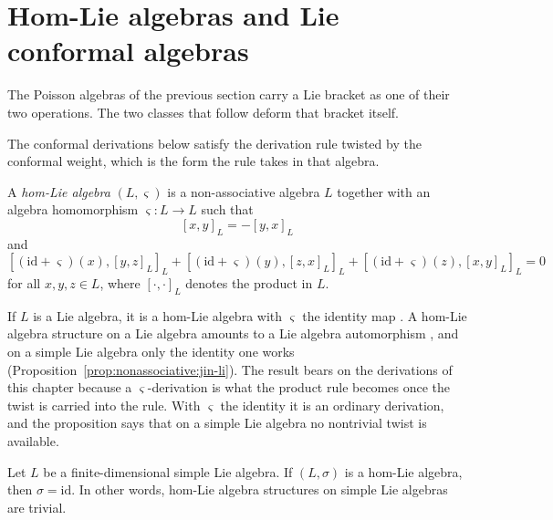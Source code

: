 \section{Hom-Lie algebras and Lie conformal algebras}\label{sec:nonassociative:hom-conformal}

The Poisson algebras of the previous section carry a Lie bracket as one of
their two operations. The two classes that follow deform that bracket
itself.

The conformal derivations below satisfy the derivation rule twisted by the
conformal weight, which is the form the rule takes in that algebra.

\begin{definition}
\label{def:nonassociative:hom-lie}
A \emph{hom-Lie algebra} $(L,\varsigma)$ is a non-associative algebra $L$
together with an algebra homomorphism $\varsigma\colon L\to L$ such that
\[
[x,y]_L=-[y,x]_L
\]
and
\[
[(\mathrm{id}+\varsigma)(x),[y,z]_L]_L
+[(\mathrm{id}+\varsigma)(y),[z,x]_L]_L
+[(\mathrm{id}+\varsigma)(z),[x,y]_L]_L=0
\]
for all $x,y,z\in L$, where $[\cdot,\cdot]_L$ denotes the product in $L$.
\end{definition}

If $L$ is a Lie algebra, it is a hom-Lie algebra with $\varsigma$ the identity
map \cite[p.~18]{HartwigLarssonSilvestrov2006}. A hom-Lie algebra structure on
a Lie algebra amounts to a Lie algebra automorphism \cite[Section~2,
pp.~1399--1400]{JinLi2008HomLie}, and on a simple Lie algebra only the
identity one works (Proposition~\ref{prop:nonassociative:jin-li}). The result
bears on the derivations of this chapter because a $\varsigma$-derivation is
what the product rule becomes once the twist is carried into the rule. With
$\varsigma$ the identity it is an ordinary derivation, and the proposition
says that on a simple Lie algebra no nontrivial twist is available.

\begin{proposition}
\label{prop:nonassociative:jin-li}
Let $L$ be a finite-dimensional simple Lie algebra. If $(L,\sigma)$ is a
hom-Lie algebra, then $\sigma=\mathrm{id}$. In other words, hom-Lie algebra
structures on simple Lie algebras are trivial.
\end{proposition}

